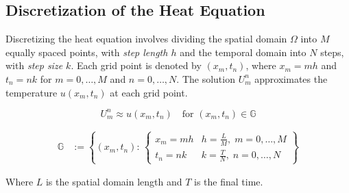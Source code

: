 \subsection{Discretization of the Heat Equation}
Discretizing the heat equation involves dividing the spatial domain \(\Omega\) into \(M\) equally spaced points, with \emph{step length \(h\)} and the temporal domain into \(N\) steps, with \emph{step size \(k\)}.
Each grid point is denoted by \((x_m, t_n)\), where \(x_m = m h\) and \(t_n = n k\) for \(m = 0, \ldots, M\) and \(n = 0, \ldots, N\). The solution \(U_m^n\) approximates the temperature \(u(x_m, t_n)\) at each grid point.

\[
  U_m^n \approx u(x_m, t_n) \quad \text{for } (x_m, t_n) \in \mathbb{G}
\]


\begin{align*}
  \mathbb{G} & := \left\{ (x_m, t_n):\,
  \begin{cases}
    x_m = m h & h = \tfrac{L}{M},\; m = 0, \ldots, M \\
    t_n = n k & k = \tfrac{T}{N},\; n = 0, \ldots, N
  \end{cases}\right\}
\end{align*}\label{eq:grid_points}

Where \(L\) is the spatial domain length and \(T\) is the final time.

\begin{center}
\end{center}

